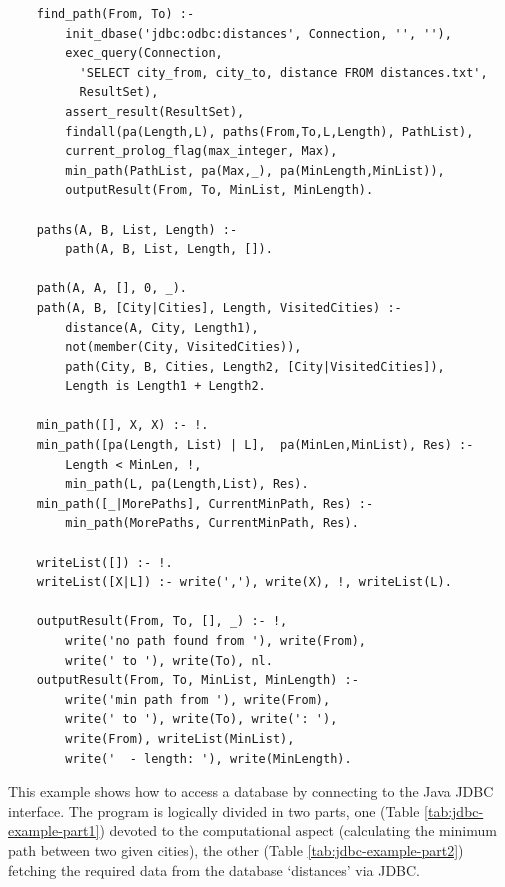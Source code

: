 \begin{table}
\footnotesize
\begin{verbatim}
    find_path(From, To) :-
        init_dbase('jdbc:odbc:distances', Connection, '', ''),
        exec_query(Connection,
          'SELECT city_from, city_to, distance FROM distances.txt',
          ResultSet),
        assert_result(ResultSet),
        findall(pa(Length,L), paths(From,To,L,Length), PathList),
        current_prolog_flag(max_integer, Max),
        min_path(PathList, pa(Max,_), pa(MinLength,MinList)),
        outputResult(From, To, MinList, MinLength).

    paths(A, B, List, Length) :-
        path(A, B, List, Length, []).

    path(A, A, [], 0, _).
    path(A, B, [City|Cities], Length, VisitedCities) :-
        distance(A, City, Length1),
        not(member(City, VisitedCities)),
        path(City, B, Cities, Length2, [City|VisitedCities]),
        Length is Length1 + Length2.

    min_path([], X, X) :- !.
    min_path([pa(Length, List) | L],  pa(MinLen,MinList), Res) :-
        Length < MinLen, !,
        min_path(L, pa(Length,List), Res).
    min_path([_|MorePaths], CurrentMinPath, Res) :-
        min_path(MorePaths, CurrentMinPath, Res).

    writeList([]) :- !.
    writeList([X|L]) :- write(','), write(X), !, writeList(L).

    outputResult(From, To, [], _) :- !,
        write('no path found from '), write(From),
        write(' to '), write(To), nl.
    outputResult(From, To, MinList, MinLength) :-
        write('min path from '), write(From),
        write(' to '), write(To), write(': '),
        write(From), writeList(MinList),
        write('  - length: '), write(MinLength).
\end{verbatim}
\caption{Calculation of the minimum path between two given cities: the required data are fetched from a database via JDBC as shown in Table \ref{tab:jdbc-example-part2}.}
\label{tab:jdbc-example-part1}
\end{table}

This example shows how to access a database by connecting \tuprolog{} to the Java JDBC interface.
%
The program is logically divided in two parts, one (Table \ref{tab:jdbc-example-part1}) devoted to the computational aspect (calculating the minimum path between two given cities), the other (Table \ref{tab:jdbc-example-part2}) fetching the required data from the database `distances' via JDBC.

